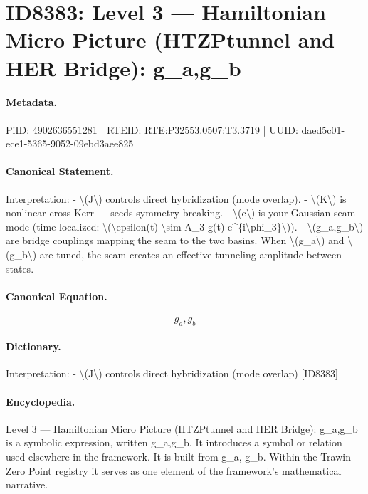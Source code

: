 \section*{ID8383: Level 3 — Hamiltonian Micro Picture (HTZPtunnel and HER Bridge): g\_a,g\_b}
\paragraph{Metadata.}
PiID: 4902636551281 | RTEID: RTE:P32553.0507:T3.3719 | UUID: daed5c01-ece1-5365-9052-09ebd3aee825

\paragraph{Canonical Statement.}
Interpretation: - \textbackslash{}(J\textbackslash{}) controls direct hybridization (mode overlap). - \textbackslash{}(K\textbackslash{}) is nonlinear cross-Kerr — seeds symmetry-breaking. - \textbackslash{}(c\textbackslash{}) is your Gaussian seam mode (time-localized: \textbackslash{}(\textbackslash{}epsilon(t) \textbackslash{}sim A\_3 g(t) e\textasciicircum{}\{i\textbackslash{}phi\_3\}\textbackslash{})). - \textbackslash{}(g\_a,g\_b\textbackslash{}) are bridge couplings mapping the seam to the two basins. When \textbackslash{}(g\_a\textbackslash{}) and \textbackslash{}(g\_b\textbackslash{}) are tuned, the seam creates an effective tunneling amplitude between states.

\paragraph{Canonical Equation.}
\[
g_a,g_b
\]

\paragraph{Dictionary.}
Interpretation: - \textbackslash{}(J\textbackslash{}) controls direct hybridization (mode overlap) [ID8383]

\paragraph{Encyclopedia.}
Level 3 — Hamiltonian Micro Picture (HTZPtunnel and HER Bridge): g\_a,g\_b is a symbolic expression, written g\_a,g\_b. It introduces a symbol or relation used elsewhere in the framework. It is built from g\_a, g\_b. Within the Trawin Zero Point registry it serves as one element of the framework's mathematical narrative.
